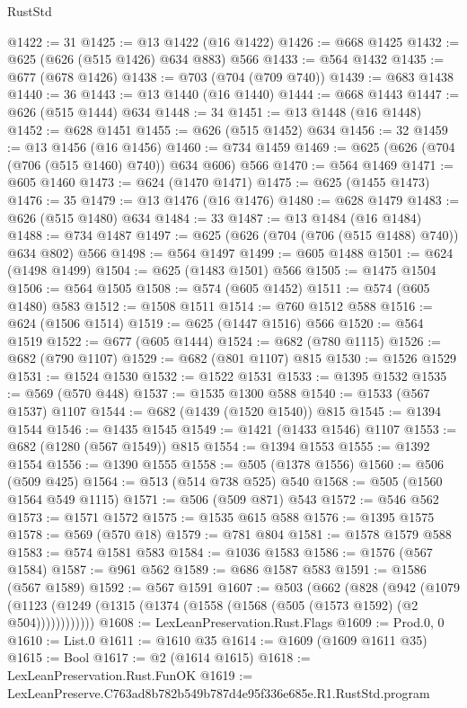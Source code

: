 \begin{lexlean}{RustStd}
\begin{coremodule}
@1422 := 31
@1425 := @13 @1422 (@16 @1422)
@1426 := @668 @1425
@1432 := @625 (@626 (@515 @1426) @634 @883) @566
@1433 := @564 @1432
@1435 := @677 (@678 @1426)
@1438 := @703 (@704 (@709 @740))
@1439 := @683 @1438
@1440 := 36
@1443 := @13 @1440 (@16 @1440)
@1444 := @668 @1443
@1447 := @626 (@515 @1444) @634
@1448 := 34
@1451 := @13 @1448 (@16 @1448)
@1452 := @628 @1451
@1455 := @626 (@515 @1452) @634
@1456 := 32
@1459 := @13 @1456 (@16 @1456)
@1460 := @734 @1459
@1469 := @625 (@626 (@704 (@706 (@515 @1460) @740)) @634 @606) @566
@1470 := @564 @1469
@1471 := @605 @1460
@1473 := @624 (@1470 @1471)
@1475 := @625 (@1455 @1473)
@1476 := 35
@1479 := @13 @1476 (@16 @1476)
@1480 := @628 @1479
@1483 := @626 (@515 @1480) @634
@1484 := 33
@1487 := @13 @1484 (@16 @1484)
@1488 := @734 @1487
@1497 := @625 (@626 (@704 (@706 (@515 @1488) @740)) @634 @802) @566
@1498 := @564 @1497
@1499 := @605 @1488
@1501 := @624 (@1498 @1499)
@1504 := @625 (@1483 @1501) @566
@1505 := @1475 @1504
@1506 := @564 @1505
@1508 := @574 (@605 @1452)
@1511 := @574 (@605 @1480) @583
@1512 := @1508 @1511
@1514 := @760 @1512 @588
@1516 := @624 (@1506 @1514)
@1519 := @625 (@1447 @1516) @566
@1520 := @564 @1519
@1522 := @677 (@605 @1444)
@1524 := @682 (@780 @1115)
@1526 := @682 (@790 @1107)
@1529 := @682 (@801 @1107) @815
@1530 := @1526 @1529
@1531 := @1524 @1530
@1532 := @1522 @1531
@1533 := @1395 @1532
@1535 := @569 (@570 @448)
@1537 := @1535 @1300 @588
@1540 := @1533 (@567 @1537) @1107
@1544 := @682 (@1439 (@1520 @1540)) @815
@1545 := @1394 @1544
@1546 := @1435 @1545
@1549 := @1421 (@1433 @1546) @1107
@1553 := @682 (@1280 (@567 @1549)) @815
@1554 := @1394 @1553
@1555 := @1392 @1554
@1556 := @1390 @1555
@1558 := @505 (@1378 @1556)
@1560 := @506 (@509 @425)
@1564 := @513 (@514 @738 @525) @540
@1568 := @505 (@1560 @1564 @549 @1115)
@1571 := @506 (@509 @871) @543
@1572 := @546 @562
@1573 := @1571 @1572
@1575 := @1535 @615 @588
@1576 := @1395 @1575
@1578 := @569 (@570 @18)
@1579 := @781 @804
@1581 := @1578 @1579 @588
@1583 := @574 @1581 @583
@1584 := @1036 @1583
@1586 := @1576 (@567 @1584)
@1587 := @961 @562
@1589 := @686 @1587 @583
@1591 := @1586 (@567 @1589)
@1592 := @567 @1591
@1607 := @503
    (@662
      (@828
        (@942
          (@1079 (@1123 (@1249 (@1315 (@1374 (@1558 (@1568 (@505 (@1573 @1592) (@2 @504))))))))))))
@1608 := LexLeanPreservation.Rust.Flags
@1609 := Prod.{0, 0}
@1610 := List.{0}
@1611 := @1610 @35
@1614 := @1609 (@1609 @1611 @35)
@1615 := Bool
@1617 := @2 (@1614 @1615)
@1618 := LexLeanPreservation.Rust.FunOK
@1619 := LexLeanPreserve.C763ad8b782b549b787d4e95f336e685e.R1.RustStd.program

\end{coremodule}
\end{lexlean}
